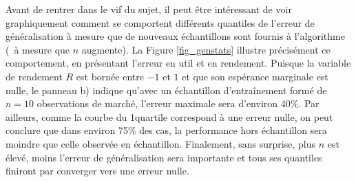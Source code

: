 Avant de rentrer dans le vif du sujet, il peut être intéressant de voir graphiquement
comment se comportent différents quantiles de l'erreur de généralisation à mesure que de
nouveaux échantillons sont fournis à l'algorithme (\ie\ à mesure que $n$ augmente). La
Figure \ref{fig_genstats} illustre précisément ce comportement, en présentant l'erreur en
util et en rendement. Puisque la variable de rendement $R$ est bornée entre $-1$ et $1$ et
que son espérance marginale est nulle, le panneau b) indique qu'avec un échantillon
d'entraînement formé de $n=10$ observations de marché, l'erreur maximale sera d'environ
40\%. Par ailleurs, comme la courbe du 1\ier quartile correspond à une erreur nulle, on
peut conclure que dans environ 75\% des cas, la performance hors échantillon sera moindre
que celle observée en échantillon. Finalement, sans surprise, plus $n$ est élevé, moins
l'erreur de généralisation sera importante et tous ses quantiles finiront par converger
vers une erreur nulle. 





